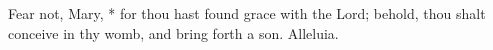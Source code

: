 Fear not, Mary, * for thou hast found grace with the Lord; behold, thou shalt conceive in thy womb, and bring forth a son. Alleluia. 